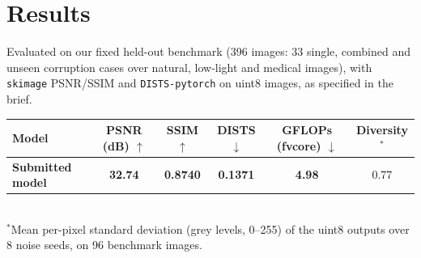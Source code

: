 \documentclass[10pt,a4paper]{article}
\begin{document}
\section{Results}
Evaluated on our fixed held-out benchmark (396 images: 33 single, combined and unseen corruption
cases over natural, low-light and medical images), with \texttt{skimage} PSNR/SSIM and
\texttt{DISTS-pytorch} on uint8 images, as specified in the brief.
\begin{center}
\small
\begin{tabular}{@{}lccccc@{}}
\toprule
Model & PSNR (dB) $\uparrow$ & SSIM $\uparrow$ & DISTS $\downarrow$ & GFLOPs (fvcore) $\downarrow$ &
  Diversity$^{*}$ \\
\midrule
\textbf{Submitted model} & \textbf{32.74} & \textbf{0.8740} & \textbf{0.1371}
  & \textbf{4.98} & 0.77 \\
\bottomrule
\end{tabular}\\[2pt]
{\footnotesize $^{*}$Mean per-pixel standard deviation (grey levels, 0--255) of the uint8 outputs
over 8 noise seeds, on 96 benchmark images.}
\end{center}
\end{document}
